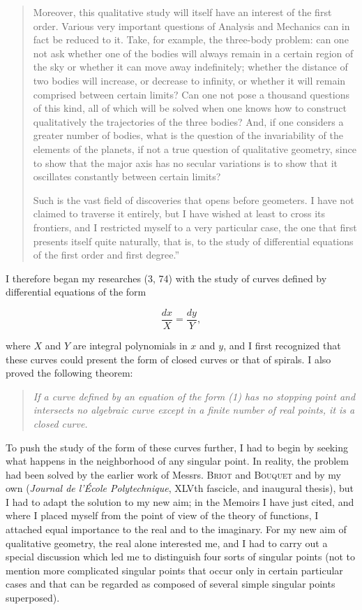 \documentclass[11pt]{article}
\begin{document}
\begin{quote}
Moreover, this qualitative study will itself have an interest of the first order. Various very important questions of Analysis and Mechanics can in fact be reduced to it. Take, for example, the three-body problem: can one not ask whether one of the bodies will always remain in a certain region of the sky or whether it can move away indefinitely; whether the distance of two bodies will increase, or decrease to infinity, or whether it will remain comprised between certain limits? Can one not pose a thousand questions of this kind, all of which will be solved when one knows how to construct qualitatively the trajectories of the three bodies? And, if one considers a greater number of bodies, what is the question of the invariability of the elements of the planets, if not a true question of qualitative geometry, since to show that the major axis has no secular variations is to show that it oscillates constantly between certain limits?

Such is the vast field of discoveries that opens before geometers. I have not claimed to traverse it entirely, but I have wished at least to cross its frontiers, and I restricted myself to a very particular case, the one that first presents itself quite naturally, that is, to the study of differential equations of the first order and first degree.”
\end{quote}

I therefore began my researches (3, 74) with the study of curves defined by differential equations of the form

\begin{equation*}
\frac{dx}{X}=\frac{dy}{Y},
\tag{1}
\end{equation*}

where $X$ and $Y$ are integral polynomials in $x$ and $y$, and I first recognized that these curves could present the form of closed curves or that of spirals. I also proved the following theorem:

\begin{quote}
\emph{If a curve defined by an equation of the form (1) has no stopping point and intersects no algebraic curve except in a finite number of real points, it is a closed curve.}
\end{quote}

To push the study of the form of these curves further, I had to begin by seeking what happens in the neighborhood of any singular point. In reality, the problem had been solved by the earlier work of Messrs. \textsc{Briot} and \textsc{Bouquet} and by my own (\emph{Journal de l’École Polytechnique}, XLVth fascicle, and inaugural thesis), but I had to adapt the solution to my new aim; in the Memoirs I have just cited, and where I placed myself from the point of view of the theory of functions, I attached equal importance to the real and to the imaginary. For my new aim of qualitative geometry, the real alone interested me, and I had to carry out a special discussion which led me to distinguish four sorts of singular points (not to mention more complicated singular points that occur only in certain particular cases and that can be regarded as composed of several simple singular points superposed).
\end{document}
